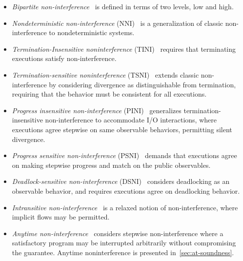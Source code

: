 \begin{itemize}

\item\emph{Bipartite non-interference}~\cite{aceto2024}
is defined in terms of two levels, low and high.

\item\emph{Nondeterministic non-interference} (NNI)~\cite{focardi1997}
is a generalization of classic non-interference to nondeterministic systems.

\item\emph{Termination-Insensitive noninterference} (TINI)~\cite{hedin2012}
requires that terminating executions satisfy non-interference.

\item\emph{Termination-sensitive noninterference} (TSNI)~\cite{hedin2012}
extends classic non-interference by considering divergence as distinguishable from termination,
requiring that the behavior must be consistent for all executions.

\item\emph{Progress insensitive non-interference} (PINI)~\cite{bay2020}
generalizes termination-insensitive non-interference to accommodate I/O interactions,
where executions agree stepwise on same observable behaviors, permitting silent divergence.

\item\emph{Progress sensitive non-interference} (PSNI)~\cite{hedin2012}
demands that executions agree on making stepwise progress and match on the public observables.

\item\emph{Deadlock-sensitive non-interference} (DSNI)~\cite{vandenheuvel2024}
considers deadlocking as an observable behavior,
and requires executions agree on deadlocking behavior.

\item\emph{Intransitive non-interference}~\cite{roscoe1999}
is a relaxed notion of non-interference, where implicit flows may be permitted.

\item\emph{Anytime non-interference}~\cite{aubert2025}
considers stepwise non-interference where a satisfactory program may be interrupted arbitrarily without compromising the guarantee.
Anytime noninterference is presented in~\autoref{sec:at-soundness}.

\end{itemize}
